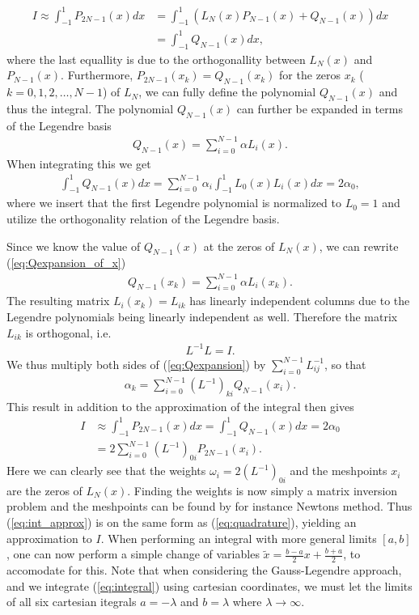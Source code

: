 \documentclass[twocolumn]{aastex62}
\begin{document}
\begin{align}
	I \approx \int^1_{-1} P_{2N-1}(x) dx &= \int^1_{-1} (L_N(x)P_{N-1}(x) + Q_{N-1}(x))dx \\
	&= \int^1_{-1}Q_{N-1}(x)dx,
\end{align}
where the last equallity is due to the orthogonallity between $L_N(x)$ and
$P_{N-1}(x)$. Furthermore, $P_{2N-1}(x_k) = Q_{N-1}(x_k)$ for the zeros $x_k$
($k = 0, 1, 2,\ldots, N-1$) of $L_N$, we can fully define the polynomial
$Q_{N-1}(x)$ and thus the integral. The polynomial $Q_{N-1}(x)$ can further be
expanded in terms of the Legendre basis 
\begin{align}
	Q_{N-1}(x) = \sum^{N-1}_{i=0} \alpha L_i(x).
	\label{eq:Qexpansion_of_x}
\end{align}
When integrating this we get
\begin{align}
	\int^1_{-1}Q_{N-1}(x)dx = \sum^{N-1}_{i=0} \alpha_i\int^1_{-1}L_0(x)L_i(x) dx = 2\alpha_0,
\end{align}
where we insert that the first Legendre polynomial is normalized to $L_0 = 1$
and utilize the orthogonality relation of the Legendre basis.

Since we know the value of $Q_{N-1}(x)$ at the zeros of $L_N(x)$, we can rewrite
(\ref{eq:Qexpansion_of_x})
\begin{align}
	Q_{N-1} (x_k)= \sum^{N-1}_{i=0} \alpha L_i(x_k).
	\label{eq:Qexpansion}
\end{align}
The resulting matrix $L_i(x_k) = L_{ik}$ has linearly independent columns due to
the Legendre polynomials being linearly independent as well. Therefore the
matrix $L_{ik}$ is orthogonal, i.e.
\begin{align}
	L^{-1}L = I.
\end{align}
We thus multiply both sides of (\ref{eq:Qexpansion}) by
$\sum^{N-1}_{i=0}L^{-1}_{ij}$, so that 
\begin{align}
	\alpha_k = \sum_{i=0}^{N-1} (L^{-1})_{ki}Q_{N-1}(x_i).
\end{align}
This result in addition to the approximation of the integral then gives
\begin{align}
	I &\approx \int^1_{-1} P_{2N-1}(x)dx = \int^1_{-1} Q_{N-1}(x)dx = 2\alpha_0 \\
	&= 2 \sum^{N-1}_{i=0} (L^{-1})_{0i}P_{2N-1}(x_i).
	\label{eq:int_approx}
\end{align}
Here we can clearly see that the weights $\omega_i = 2(L^{-1})_{0i}$ and the
meshpoints $x_i$ are the zeros of $L_N(x)$. Finding the weights is now simply a
matrix inversion problem and the meshpoints can be found by for instance Newtons
method. Thus (\ref{eq:int_approx}) is on the same form as (\ref{eq:quadrature}),
yielding an approximation to $I$. When performing an integral with more general
limits $[a,b]$, one can now perform a simple change of variables $\tilde{x} =
\frac{b - a}{2}x + \frac{b + a}{2}$, to accomodate for this. Note that when
considering the Gauss-Legendre approach, and we integrate (\ref{eq:integral})
using cartesian coordinates, we must let the limits of all six cartesian
itegrals $a = -\lambda$ and $b = \lambda$ where $\lambda\to\infty$.
\end{document}
